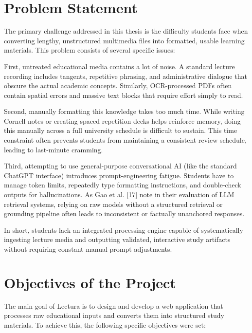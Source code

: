 \section{Problem Statement}
The primary challenge addressed in this thesis is the difficulty students face when converting lengthy, unstructured multimedia files into formatted, usable learning materials. This problem consists of several specific issues:

First, untreated educational media contains a lot of noise. A standard lecture recording includes tangents, repetitive phrasing, and administrative dialogue that obscure the actual academic concepts. Similarly, OCR-processed PDFs often contain spatial errors and massive text blocks that require effort simply to read.

Second, manually formatting this knowledge takes too much time. While writing Cornell notes or creating spaced repetition decks helps reinforce memory, doing this manually across a full university schedule is difficult to sustain. This time constraint often prevents students from maintaining a consistent review schedule, leading to last-minute cramming.

Third, attempting to use general-purpose conversational AI (like the standard ChatGPT interface) introduces prompt-engineering fatigue. Students have to manage token limits, repeatedly type formatting instructions, and double-check outputs for hallucinations. As Gao et al. [17] note in their evaluation of LLM retrieval systems, relying on raw models without a structured retrieval or grounding pipeline often leads to inconsistent or factually unanchored responses. 

In short, students lack an integrated processing engine capable of systematically ingesting lecture media and outputting validated, interactive study artifacts without requiring constant manual prompt adjustments.

\section{Objectives of the Project}
The main goal of Lectura is to design and develop a web application that processes raw educational inputs and converts them into structured study materials. To achieve this, the following specific objectives were set:

